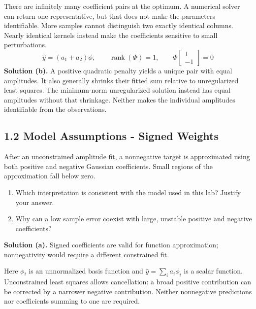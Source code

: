 \documentclass[11pt,a4paper]{article}
\begin{document}
There are infinitely many coefficient pairs at the optimum.
A numerical solver can return one representative, but that does not make the parameters identifiable.
More samples cannot distinguish two exactly identical columns.
Nearly identical kernels instead make the coefficients sensitive to small perturbations.
\[
\hat y=(a_1+a_2)\phi,\qquad\operatorname{rank}(\Phi)=1,\qquad\Phi\begin{bmatrix}1\\-1\end{bmatrix}=0
\]
\noindent\textbf{Solution (b).} A positive quadratic penalty yields a unique pair with equal amplitudes.
It also generally shrinks their fitted sum relative to unregularized least squares.
The minimum-norm unregularized solution instead has equal amplitudes without that shrinkage.
Neither makes the individual amplitudes identifiable from the observations.
\subsection*{1.2 Model Assumptions - Signed Weights}
After an unconstrained amplitude fit, a nonnegative target is approximated using both positive and negative Gaussian coefficients.
Small regions of the approximation fall below zero.
\begin{enumerate}[label=(\alph*),nosep]
\item Which interpretation is consistent with the model used in this lab?
Justify your answer.
\item Why can a low sample error coexist with large, unstable positive and negative coefficients?
\end{enumerate}
\noindent\textbf{Solution (a).} Signed coefficients are valid for function approximation; nonnegativity would require a different constrained fit.

Here $\phi$${}_i$ is an unnormalized basis function and $\hat y=\sum_i a_i\phi_i$ is a scalar function.
Unconstrained least squares allows cancellation: a broad positive contribution can be corrected by a narrower negative contribution.
Neither nonnegative predictions nor coefficients summing to one are required.
\end{document}
